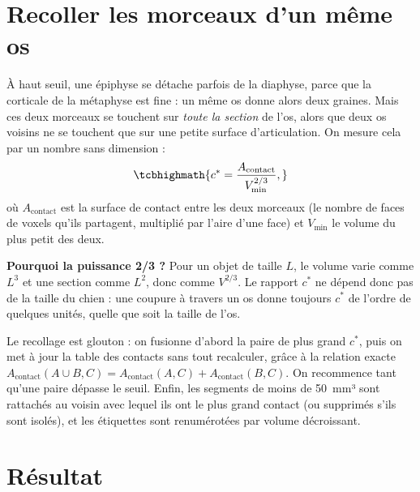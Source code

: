 \section{Recoller les morceaux d'un même os}
\label{sec:cstar}

À haut seuil, une épiphyse se détache parfois de la diaphyse, parce que la corticale de la métaphyse est fine : un
même os donne alors deux graines. Mais ces deux morceaux se touchent sur \emph{toute la section} de l'os, alors que
deux os voisins ne se touchent que sur une petite surface d'articulation. On mesure cela par un nombre sans
dimension :
\begin{equation}
  \tcbhighmath{c^* = \frac{A_{\text{contact}}}{V_{\min}^{2/3}},}
  \label{eq:cstar}
\end{equation}
où $A_{\text{contact}}$ est la surface de contact entre les deux morceaux (le nombre de faces de voxels qu'ils
partagent, multiplié par l'aire d'une face) et $V_{\min}$ le volume du plus petit des deux.

\begin{pourquoi}
\textbf{Pourquoi la puissance 2/3 ?} Pour un objet de taille $L$, le volume varie comme $L^3$ et une section comme
$L^2$, donc comme $V^{2/3}$. Le rapport $c^*$ ne dépend donc pas de la taille du chien : une coupure à travers un os
donne toujours $c^*$ de l'ordre de quelques unités, quelle que soit la taille de l'os.
\end{pourquoi}


Le recollage est glouton : on fusionne d'abord la paire de plus grand $c^*$, puis on met à jour la table des contacts
sans tout recalculer, grâce à la relation exacte
$A_{\text{contact}}(A \cup B, C) = A_{\text{contact}}(A, C) + A_{\text{contact}}(B, C)$. On recommence tant qu'une
paire dépasse le seuil. Enfin, les segments de moins de 50~mm³ sont rattachés au voisin avec lequel ils ont le plus
grand contact (ou supprimés s'ils sont isolés), et les étiquettes sont renumérotées par volume décroissant.

\section{Résultat}


